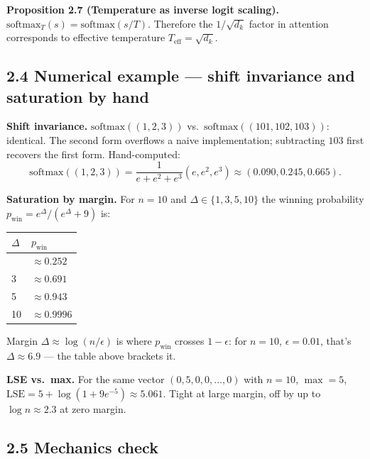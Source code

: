 \documentclass[
]{article}
\begin{document}
\textbf{Proposition 2.7 (Temperature as inverse logit scaling).}
\(\text{softmax}_T(s) = \text{softmax}(s/T)\). Therefore the
\(1/\sqrt{d_k}\) factor in attention corresponds to effective
temperature \(T_{\text{eff}} = \sqrt{d_k}\).

\hypertarget{numerical-example-shift-invariance-and-saturation-by-hand}{%
\subsection{2.4 Numerical example --- shift invariance and saturation by
hand}\label{numerical-example-shift-invariance-and-saturation-by-hand}}

\textbf{Shift invariance.} \(\text{softmax}((1, 2, 3))\)
vs.~\(\text{softmax}((101, 102, 103))\): identical. The second form
overflows a naive implementation; subtracting \(103\) first recovers the
first form. Hand-computed:
\[\text{softmax}((1, 2, 3)) = \frac{1}{e + e^2 + e^3} (e, e^2, e^3) \approx (0.090, 0.245, 0.665).\]

\textbf{Saturation by margin.} For \(n = 10\) and
\(\Delta \in \{1, 3, 5, 10\}\) the winning probability
\(p_{\text{win}} = e^\Delta / (e^\Delta + 9)\) is:

\begin{longtable}[]{@{}ll@{}}
\toprule\noalign{}
\(\Delta\) & \(p_{\text{win}}\) \\
\midrule\noalign{}
\endhead
\bottomrule\noalign{}
\endlastfoot
1 & \(\approx 0.252\) \\
3 & \(\approx 0.691\) \\
5 & \(\approx 0.943\) \\
10 & \(\approx 0.9996\) \\
\end{longtable}

Margin \(\Delta \approx \log(n / \epsilon)\) is where \(p_{\text{win}}\)
crosses \(1 - \epsilon\): for \(n = 10\), \(\epsilon = 0.01\), that's
\(\Delta \approx 6.9\) --- the table above brackets it.

\textbf{LSE vs.~max.} For the same vector \((0, 5, 0, 0, \dots, 0)\)
with \(n = 10\), \(\max = 5\),
\(\text{LSE} = 5 + \log(1 + 9e^{-5}) \approx 5.061\). Tight at large
margin, off by up to \(\log n \approx 2.3\) at zero margin.

\hypertarget{mechanics-check}{%
\subsection{2.5 Mechanics check}\label{mechanics-check}}
\end{document}
